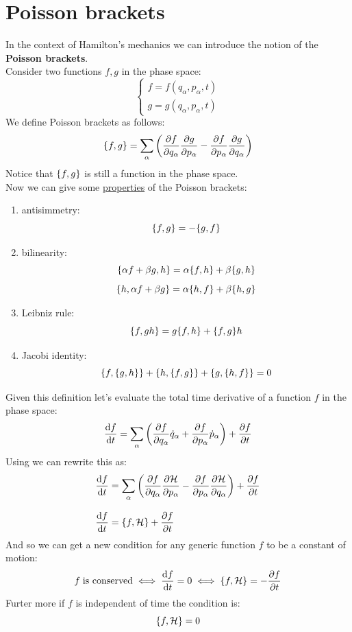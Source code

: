 \section{Poisson brackets}
In the context of Hamilton's mechanics we can introduce the notion of the \textbf{Poisson brackets}.\\
Consider two functions $f,g$ in the phase space:
\begin{equation}
    \begin{cases}
        f = f(q_{\alpha},p_{\alpha},t)\\
        g = g(q_{\alpha},p_{\alpha},t)
    \end{cases}
\end{equation}
We define Poisson brackets as follows:
\begin{equation}
    \pb{f}{g} = \bigsum_{\alpha}\brackets{\pdv{f}{q_{\alpha}}\pdv{g}{p_\alpha} - \pdv{f}{p_{\alpha}}\pdv{g}{q_{\alpha}}}
\end{equation}
Notice that $\pb{f}{g}$ is still a function in the phase space.\\
Now we can give some \underline{properties} of the Poisson brackets:
\begin{enumerate}
    \item antisimmetry: \[\pb{f}{g} = - \pb{g}{f}\]
    \item bilinearity:
    \[\pb{\alpha f + \beta g}{h} = \alpha\pb{f}{h}+ \beta\pb{g}{h}\]
    \[\pb{h}{\alpha f + \beta g} = \alpha\pb{h}{f}+ \beta\pb{h}{g}\]
    \item Leibniz rule: \[\pb{f}{gh} = g\pb{f}{h} + \pb{f}{g}h\]
    \item Jacobi identity: \[\pb{f}{\pb{g}{h}} + \pb{h}{\pb{f}{g}} + \pb{g}{\pb{h}{f}} = 0\]
\end{enumerate}
Given this definition let's evaluate the total time derivative of a function $f$ in the phase space:
\begin{equation}
    \dv{f}{t} = \bigsum_{\alpha}\brackets{\pdv{f}{q_{\alpha}}\dot{q}_{\alpha} + \pdv{f}{p_{\alpha}}\dot{p}_{\alpha}} + \pdv{f}{t}
\end{equation}
Using \hamiltonref\;we can rewrite this as:
\begin{equation}
    \begin{split}
        \dv{f}{t} &= \bigsum_{\alpha}\brackets{\pdv{f}{q_{\alpha}}\pdv{\hamfun}{p_{\alpha}} - \pdv{f}{p_{\alpha}}\pdv{\hamfun}{q_{\alpha}}} + \pdv{f}{t}\\[8pt]
        \dv{f}{t} &= \pb{f}{\hamfun} + \pdv{f}{t}
    \end{split}
\end{equation}
And so we can get a new condition for any generic function $f$ to be a constant of motion:
\begin{equation}
    f\;\text{is conserved} \iff \dv{f}{t} = 0 \iff \pb{f}{\hamfun} = -\pdv{f}{t}
\end{equation}
Furter more if $f$ is independent of time the condition is:
\begin{equation}
    \pb{f}{\hamfun} = 0
\end{equation}
